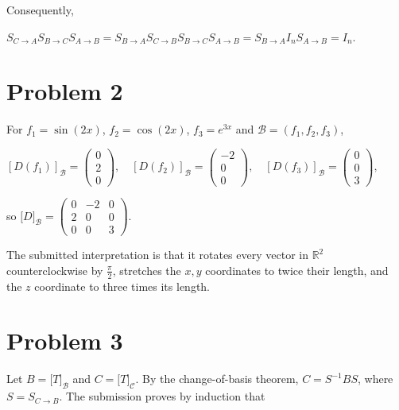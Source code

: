 Consequently,

\(S_{C\rightarrow A}S_{B\rightarrow C}S_{A\rightarrow B} = S_{B\rightarrow A}S_{C\rightarrow B}S_{B\rightarrow C}S_{A\rightarrow B} = S_{B\rightarrow A}I_{n}S_{A\rightarrow B} = I_{n}.\)

\section{Problem 2}

For \(f_{1} = \sin\left( {2x} \right)\), \(f_{2} = \cos\left( {2x} \right)\), \(f_{3} = e^{3x}\) and \(\mathcal{B} = \left( {f_{1},f_{2},f_{3}} \right)\),

\(\left\lbrack {D\left( f_{1} \right)} \right\rbrack_{\mathcal{B}} = \begin{pmatrix}
0 \\
2 \\
0
\end{pmatrix},\quad\left\lbrack {D\left( f_{2} \right)} \right\rbrack_{\mathcal{B}} = \begin{pmatrix}
{- 2} \\
0 \\
0
\end{pmatrix},\quad\left\lbrack {D\left( f_{3} \right)} \right\rbrack_{\mathcal{B}} = \begin{pmatrix}
0 \\
0 \\
3
\end{pmatrix},\)

so \(\lbrack D\rbrack_{\mathcal{B}} = \begin{pmatrix}
0 & {- 2} & 0 \\
2 & 0 & 0 \\
0 & 0 & 3
\end{pmatrix}\).

The submitted interpretation is that it rotates every vector in \(\mathbb{R}^{2}\) counterclockwise by \(\frac{\pi}{2}\), stretches the \(x,y\) coordinates to twice their length, and the \(z\) coordinate to three times its length.

\section{Problem 3}

Let \(B = \lbrack T\rbrack_{\mathcal{B}}\) and \(C = \lbrack T\rbrack_{\mathcal{C}}\). By the change-of-basis theorem, \(C = S^{- 1}BS\), where \(S = S_{C\rightarrow B}\). The submission proves by induction that

